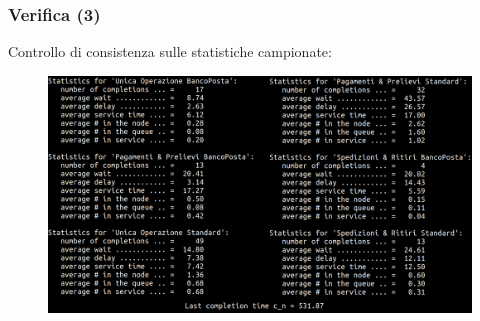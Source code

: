 \documentclass[
	usepdftitle=false,
	xcolor={table, dvipsnames},
	hyperref={
		pdftitle={Studio delle prestazioni di un Ufficio Postale ispirato a Poste Italiane},
    	pdfauthor={A. Chillotti, C. Cuffaro e S. Tiberi}
    }
]{beamer}
\begin{document}
\begin{frame}
\begin{figure}[ht]
\begin{subfigure}[b]{0.475\textwidth}
\end{subfigure}
\end{figure}
\end{frame}

\begin{frame}
\frametitle{Verifica (3)}
Controllo di consistenza sulle statistiche campionate:
\begin{figure}[ht]  
\centering 
\includegraphics[width=\textwidth]{screenshots/original/statistics}
\end{figure}
\end{frame}
\end{document}
